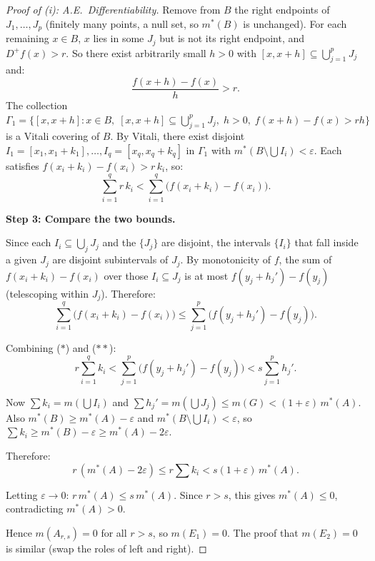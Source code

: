 \documentclass[11pt]{report}
\begin{document}
\begin{proof}[Proof of (i): A.E.\ Differentiability]
Remove from $B$ the right endpoints of $J_1, \ldots, J_p$ (finitely many points, a null set, so $m^*(B)$ is unchanged). For each remaining $x \in B$, $x$ lies in some $J_j$ but is not its right endpoint, and $D^+ f(x) > r$. So there exist arbitrarily small $h > 0$ with $[x, x+h] \subseteq \bigcup_{j=1}^{p} J_j$ and:
\[
\frac{f(x + h) - f(x)}{h} > r.
\]
The collection $\Gamma_1 = \{[x, x+h] : x \in B,\; [x,x+h] \subseteq \bigcup_{j=1}^p J_j,\; h > 0,\; f(x+h)-f(x) > rh\}$ is a Vitali covering of $B$. By Vitali, there exist disjoint $I_1 = [x_1, x_1 + k_1], \ldots, I_q = [x_q, x_q + k_q]$ in $\Gamma_1$ with $m^*(B \setminus \bigcup I_i) < \varepsilon$. Each satisfies $f(x_i + k_i) - f(x_i) > r\,k_i$, so:
\[
\sum_{i=1}^{q} r\,k_i < \sum_{i=1}^{q} \bigl(f(x_i + k_i) - f(x_i)\bigr).  \tag{$**$}
\]

\textbf{Step 3: Compare the two bounds.}

Since each $I_i \subseteq \bigcup_j J_j$ and the $\{J_j\}$ are disjoint, the intervals $\{I_i\}$ that fall inside a given $J_j$ are disjoint subintervals of $J_j$. By monotonicity of $f$, the sum of $f(x_i + k_i) - f(x_i)$ over those $I_i \subseteq J_j$ is at most $f(y_j + h_j') - f(y_j)$ (telescoping within $J_j$). Therefore:
\[
\sum_{i=1}^{q} \bigl(f(x_i + k_i) - f(x_i)\bigr) \leq \sum_{j=1}^{p} \bigl(f(y_j + h_j') - f(y_j)\bigr).
\]

Combining ($*$) and ($**$):
\[
r \sum_{i=1}^{q} k_i < \sum_{j=1}^{p} \bigl(f(y_j + h_j') - f(y_j)\bigr) < s \sum_{j=1}^{p} h_j'.
\]

Now $\sum k_i = m(\bigcup I_i)$ and $\sum h_j' = m(\bigcup J_j) \leq m(G) < (1+\varepsilon)\,m^*(A)$. Also $m^*(B) \geq m^*(A) - \varepsilon$ and $m^*(B \setminus \bigcup I_i) < \varepsilon$, so $\sum k_i \geq m^*(B) - \varepsilon \geq m^*(A) - 2\varepsilon$.

Therefore:
\[
r\,(m^*(A) - 2\varepsilon) \leq r \sum k_i < s(1 + \varepsilon)\,m^*(A).
\]

Letting $\varepsilon \to 0$: $r\,m^*(A) \leq s\,m^*(A)$. Since $r > s$, this gives $m^*(A) \leq 0$, contradicting $m^*(A) > 0$.

Hence $m(A_{r,s}) = 0$ for all $r > s$, so $m(E_1) = 0$. The proof that $m(E_2) = 0$ is similar (swap the roles of left and right).
\end{proof}
\end{document}
